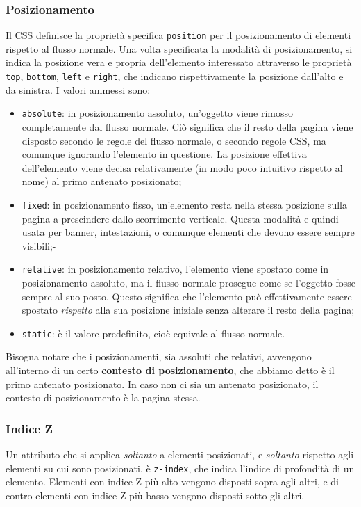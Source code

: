 \documentclass[a4paper,11pt]{article}
\begin{document}
\subsubsection{Posizionamento}
Il CSS definisce la proprietà specifica \lstinline|position| per il posizionamento di elementi rispetto al flusso normale.
Una volta specificata la modalità di posizionamento, si indica la posizione vera e propria dell'elemento interessato attraverso le proprietà \lstinline|top|, \lstinline|bottom|, \lstinline|left| e \lstinline|right|, che indicano rispettivamente la posizione dall'alto e da sinistra.
I valori ammessi sono:
\begin{itemize}
	\item \lstinline|absolute|: in posizionamento assoluto, un'oggetto viene rimosso completamente dal flusso normale. 
	Ciò significa che il resto della pagina viene disposto secondo le regole del flusso normale, o secondo regole CSS, ma comunque ignorando l'elemento in questione.
	La posizione effettiva dell'elemento viene decisa relativamente (in modo poco intuitivo rispetto al nome) al primo antenato posizionato;
	\item \lstinline|fixed|: in posizionamento fisso, un'elemento resta nella stessa posizione sulla pagina a prescindere dallo scorrimento verticale. Questa modalità e quindi usata per banner, intestazioni, o comunque elementi che devono essere sempre visibili;-
	\item \lstinline|relative|: in posizionamento relativo, l'elemento viene spostato come in posizionamento assoluto, ma il flusso normale prosegue come se l'oggetto fosse sempre al suo posto.
		Questo significa che l'elemento può effettivamente essere spostato \textit{rispetto} alla sua posizione iniziale senza alterare il resto della pagina;
	\item \lstinline|static|: è il valore predefinito, cioè equivale al flusso normale. 
\end{itemize}

Bisogna notare che i posizionamenti, sia assoluti che relativi, avvengono all'interno di un certo \textbf{contesto di posizionamento}, che abbiamo detto è il primo antenato posizionato. 
In caso non ci sia un antenato posizionato, il contesto di posizionamento è la pagina stessa.

\subsubsection{Indice Z}
Un attributo che si applica \textit{soltanto} a elementi posizionati, e \textit{soltanto} rispetto agli elementi su cui sono posizionati, è \lstinline|z-index|, che indica l'indice di profondità di un elemento. 
Elementi con indice Z più alto vengono disposti sopra agli altri, e di contro elementi con indice Z più basso vengono disposti sotto gli altri. 
\end{document}
